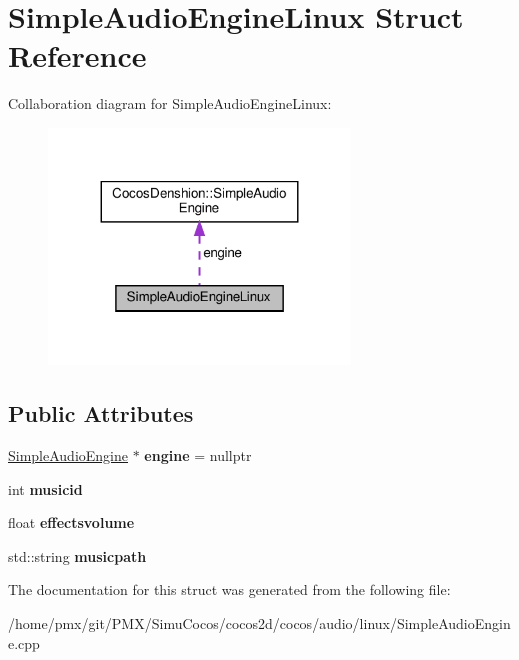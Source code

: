\hypertarget{structSimpleAudioEngineLinux}{}\section{Simple\+Audio\+Engine\+Linux Struct Reference}
\label{structSimpleAudioEngineLinux}


Collaboration diagram for Simple\+Audio\+Engine\+Linux\+:
\nopagebreak
\begin{figure}[H]
\begin{center}
\leavevmode
\includegraphics[width=227pt]{structSimpleAudioEngineLinux__coll__graph}
\end{center}
\end{figure}
\subsection*{Public Attributes}
\begin{DoxyCompactItemize}
\item 
\mbox{\label{structSimpleAudioEngineLinux_ab81699b0760230cc858c3971cb7252b1}} 
\hyperlink{classCocosDenshion_1_1SimpleAudioEngine}{Simple\+Audio\+Engine} $\ast$ {\bfseries engine} = nullptr
\item 
\mbox{\label{structSimpleAudioEngineLinux_a0d58a52525f4aa0f0bf6fbd85e238c31}} 
int {\bfseries musicid}
\item 
\mbox{\label{structSimpleAudioEngineLinux_a31e98efa742208946729f994c2c0c494}} 
float {\bfseries effectsvolume}
\item 
\mbox{\label{structSimpleAudioEngineLinux_afd29ba7fd04b555b4af459fa316fd14a}} 
std\+::string {\bfseries musicpath}
\end{DoxyCompactItemize}


The documentation for this struct was generated from the following file\+:\begin{DoxyCompactItemize}
\item 
/home/pmx/git/\+P\+M\+X/\+Simu\+Cocos/cocos2d/cocos/audio/linux/Simple\+Audio\+Engine.\+cpp\end{DoxyCompactItemize}
